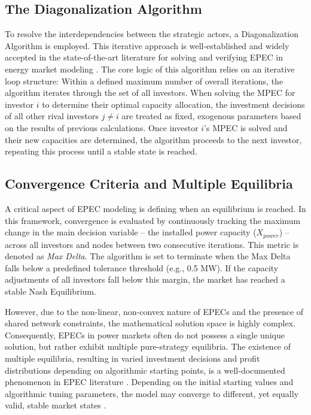 \subsection{The Diagonalization Algorithm} \label{subsect:Diagonalization}
To resolve the interdependencies between the strategic actors, a Diagonalization Algorithm is employed. This iterative approach is well-established and widely accepted in the state-of-the-art literature for solving and verifying EPEC in energy market modeling \cite{devine_strategic_2023, wogrin_capacity_2013}. The core logic of this algorithm relies on an iterative loop structure: Within a defined maximum number of overall iterations, the algorithm iterates through the set of all investors. When solving the MPEC for investor \(i\) to determine their optimal capacity allocation, the investment decisions of all other rival investors \(j\neq i\) are treated as fixed, exogenous parameters based on the results of previous calculations. Once investor \(i\)'s MPEC is solved and their new capacities are determined, the algorithm proceeds to the next investor, repeating this process until a stable state is reached.

\subsection{Convergence Criteria and Multiple Equilibria} \label{subsect:Convergence_Criteria}
A critical aspect of EPEC modeling is defining when an equilibrium is reached. In this framework, convergence is evaluated by continuously tracking the maximum change in the main decision variable -- the installed power capacity (\(X_{power}\)) -- across all investors and nodes between two consecutive iterations. This metric is denoted as \textit{Max Delta}. The algorithm is set to terminate when the Max Delta falls below a predefined tolerance threshold (e.g., 0.5 MW). If the capacity adjustments of all investors fall below this margin, the market has reached a stable Nash Equilibrium.

However, due to the non-linear, non-convex nature of EPECs and the presence of shared network constraints, the mathematical solution space is highly complex. Consequently, EPECs in power markets often do not possess a single unique solution, but rather exhibit multiple pure-strategy equilibria. The existence of multiple equilibria, resulting in varied investment decisions and profit distributions depending on algorithmic starting points, is a well-documented phenomenon in EPEC literature . Depending on the initial starting values and algorithmic tuning parameters, the model may converge to different, yet equally valid, stable market states \cite{devine_strategic_2023,wogrin_capacity_2013}.

